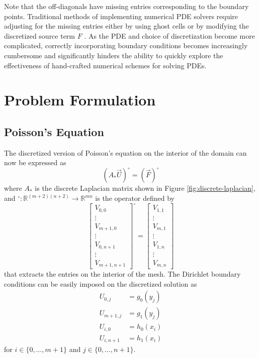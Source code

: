 \documentclass[conference]{IEEEtran}
\begin{document}
Note that the off-diagonals have missing entries corresponding to the boundary points. Traditional methods of implementing numerical PDE solvers require adjusting for the missing entries either by using ghost cells  or by modifying the discretized source term $F$ . As the PDE and choice of discretization become more complicated, correctly incorporating boundary conditions becomes increasingly cumbersome and significantly hinders the ability to quickly explore the effectiveness of hand-crafted numerical schemes for solving PDEs.


\section{Problem Formulation}

\subsection{Poisson's Equation}

The discretized version of Poisson's equation on the interior of the domain can now be expressed as
\begin{equation}
  (A_* \vec{U})^\circ = (\vec{F})^\circ
\end{equation}
where $A_*$ is the discrete Laplacian matrix shown in Figure \ref{fig:discrete-laplacian}, and ${}^\circ : \mathbb{R}^{(m+2)(n+2)} \to \mathbb{R}^{mn}$ is the operator defined by
\begin{equation}
  \begin{bmatrix}
    V_{0,0} \\ \vdots \\ V_{m+1,0} \\ \vdots \\ V_{0,n+1} \\ \vdots \\ V_{m+1,n+1}
  \end{bmatrix}^\circ = \begin{bmatrix}
    V_{1,1} \\ \vdots \\ V_{m,1} \\ \vdots \\ V_{1,n} \\ \vdots \\ V_{m,n}
  \end{bmatrix}
\end{equation}
that extracts the entries on the interior of the mesh. The Dirichlet boundary conditions can be easily imposed on the discretized solution as
\begin{align}
  U_{0,j} &= g_0(y_j) \\
  U_{m+1,j} &= g_1(y_j) \\
  U_{i,0} &= h_0(x_i) \\
  U_{i,n+1} &= h_1(x_i)
\end{align}
for $i \in \{0,\ldots,m+1\}$ and $j \in \{0,\ldots,n+1\}$.
\end{document}
